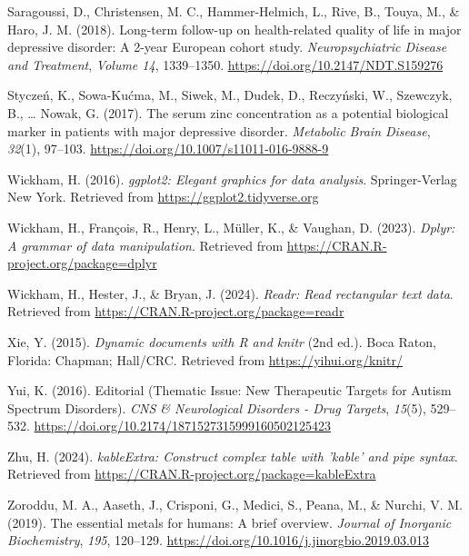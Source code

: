 \documentclass[
  man]{apa6}
\newlength{\cslhangindent}
\newlength{\cslentryspacingunit} %
\newenvironment{CSLReferences}[2] %
 {%
  \setlength{\parindent}{0pt}
  \ifodd #1
  \let\oldpar\par
  \def\par{\hangindent=\cslhangindent\oldpar}
  \fi
  \setlength{\parskip}{#2\cslentryspacingunit}
 }%
 {}
\begin{document}
\begin{CSLReferences}{1}{0}
\leavevmode{}%
Saragoussi, D., Christensen, M. C., Hammer-Helmich, L., Rive, B., Touya, M., \& Haro, J. M. (2018). Long-term follow-up on health-related quality of life in major depressive disorder: A 2-year {European} cohort study. \emph{Neuropsychiatric Disease and Treatment}, \emph{Volume 14}, 1339--1350. \url{https://doi.org/10.2147/NDT.S159276}

\leavevmode{}%
Styczeń, K., Sowa-Kućma, M., Siwek, M., Dudek, D., Reczyński, W., Szewczyk, B., \ldots{} Nowak, G. (2017). The serum zinc concentration as a potential biological marker in patients with major depressive disorder. \emph{Metabolic Brain Disease}, \emph{32}(1), 97--103. \url{https://doi.org/10.1007/s11011-016-9888-9}

\leavevmode{}%
Wickham, H. (2016). \emph{ggplot2: Elegant graphics for data analysis}. Springer-Verlag New York. Retrieved from \url{https://ggplot2.tidyverse.org}

\leavevmode{}%
Wickham, H., François, R., Henry, L., Müller, K., \& Vaughan, D. (2023). \emph{Dplyr: A grammar of data manipulation}. Retrieved from \url{https://CRAN.R-project.org/package=dplyr}

\leavevmode{}%
Wickham, H., Hester, J., \& Bryan, J. (2024). \emph{Readr: Read rectangular text data}. Retrieved from \url{https://CRAN.R-project.org/package=readr}

\leavevmode{}%
Xie, Y. (2015). \emph{Dynamic documents with {R} and knitr} (2nd ed.). Boca Raton, Florida: Chapman; Hall/CRC. Retrieved from \url{https://yihui.org/knitr/}

\leavevmode{}%
Yui, K. (2016). Editorial ({Thematic Issue}: {New Therapeutic Targets} for {Autism Spectrum Disorders}). \emph{CNS \& Neurological Disorders - Drug Targets}, \emph{15}(5), 529--532. \url{https://doi.org/10.2174/1871527315999160502125423}

\leavevmode{}%
Zhu, H. (2024). \emph{kableExtra: Construct complex table with 'kable' and pipe syntax}. Retrieved from \url{https://CRAN.R-project.org/package=kableExtra}

\leavevmode{}%
Zoroddu, M. A., Aaseth, J., Crisponi, G., Medici, S., Peana, M., \& Nurchi, V. M. (2019). The essential metals for humans: A brief overview. \emph{Journal of Inorganic Biochemistry}, \emph{195}, 120--129. \url{https://doi.org/10.1016/j.jinorgbio.2019.03.013}

\end{CSLReferences}
\end{document}
